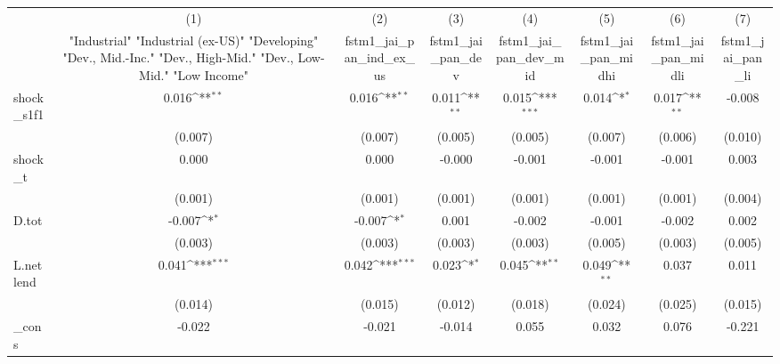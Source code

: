 {
\def\sym#1{\ifmmode^{#1}\else\(^{#1}\)\fi}
\begin{tabular}{l*{7}{c}}
\toprule
            &\multicolumn{1}{c}{(1)}&\multicolumn{1}{c}{(2)}&\multicolumn{1}{c}{(3)}&\multicolumn{1}{c}{(4)}&\multicolumn{1}{c}{(5)}&\multicolumn{1}{c}{(6)}&\multicolumn{1}{c}{(7)}\\
            &\multicolumn{1}{c}{ "Industrial" "Industrial (ex-US)" "Developing" "Dev., Mid.-Inc." "Dev., High-Mid."  "Dev., Low-Mid." "Low Income" }&\multicolumn{1}{c}{fstm1\_jai\_pan\_ind\_ex\_us}&\multicolumn{1}{c}{fstm1\_jai\_pan\_dev}&\multicolumn{1}{c}{fstm1\_jai\_pan\_dev\_mid}&\multicolumn{1}{c}{fstm1\_jai\_pan\_midhi}&\multicolumn{1}{c}{fstm1\_jai\_pan\_midli}&\multicolumn{1}{c}{fstm1\_jai\_pan\_li}\\
\midrule
shock\_s1f1  &       0.016\sym{**} &       0.016\sym{**} &       0.011\sym{**} &       0.015\sym{***}&       0.014\sym{*}  &       0.017\sym{**} &      -0.008         \\
            &     (0.007)         &     (0.007)         &     (0.005)         &     (0.005)         &     (0.007)         &     (0.006)         &     (0.010)         \\
\addlinespace
shock\_t     &       0.000         &       0.000         &      -0.000         &      -0.001         &      -0.001         &      -0.001         &       0.003         \\
            &     (0.001)         &     (0.001)         &     (0.001)         &     (0.001)         &     (0.001)         &     (0.001)         &     (0.004)         \\
\addlinespace
D.tot       &      -0.007\sym{*}  &      -0.007\sym{*}  &       0.001         &      -0.002         &      -0.001         &      -0.002         &       0.002         \\
            &     (0.003)         &     (0.003)         &     (0.003)         &     (0.003)         &     (0.005)         &     (0.003)         &     (0.005)         \\
\addlinespace
L.netlend   &       0.041\sym{***}&       0.042\sym{***}&       0.023\sym{*}  &       0.045\sym{**} &       0.049\sym{**} &       0.037         &       0.011         \\
            &     (0.014)         &     (0.015)         &     (0.012)         &     (0.018)         &     (0.024)         &     (0.025)         &     (0.015)         \\
\addlinespace
\_cons      &      -0.022         &      -0.021         &      -0.014         &       0.055         &       0.032         &       0.076         &      -0.221         \\

\end{tabular}}
